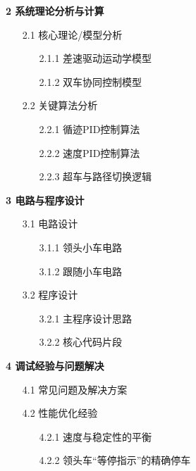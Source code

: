 \documentclass[UTF8]{ctexart}
\begin{document}
\noindent
\textbf{2 系统理论分析与计算} 
\begin{itemize}
    \item[2.1] 核心理论/模型分析 
    \begin{itemize}
        \item[2.1.1] 差速驱动运动学模型 
        \item[2.1.2] 双车协同控制模型 
    \end{itemize}
    \item[2.2] 关键算法分析 
    \begin{itemize}
        \item[2.2.1] 循迹PID控制算法 
        \item[2.2.2] 速度PID控制算法 
        \item[2.2.3] 超车与路径切换逻辑 
    \end{itemize}
\end{itemize}

\noindent
\textbf{3 电路与程序设计} 
\begin{itemize}
    \item[3.1] 电路设计 
    \begin{itemize}
        \item[3.1.1] 领头小车电路 
        \item[3.1.2] 跟随小车电路 
    \end{itemize}
    \item[3.2] 程序设计 
    \begin{itemize}
        \item[3.2.1] 主程序设计思路 
        \item[3.2.2] 核心代码片段 
    \end{itemize}
\end{itemize}

\noindent
\textbf{4 调试经验与问题解决} 
\begin{itemize}
    \item[4.1] 常见问题及解决方案 
    \item[4.2] 性能优化经验 
    \begin{itemize}
        \item[4.2.1] 速度与稳定性的平衡 
        \item[4.2.2] 领头车``等停指示''的精确停车 
    \end{itemize}
\end{itemize}
\end{document}
